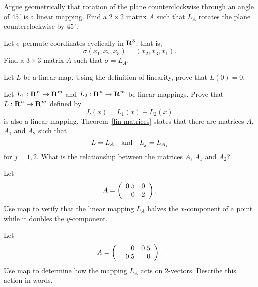 \begin{exercise} \label{c4.3.9}
Argue geometrically that rotation of the plane counterclockwise
through an angle of $45^\circ$ is a linear mapping.  Find a
$2\times 2$ matrix $A$ such that $L_A$ rotates the plane
counterclockwise by $45^\circ$.
\end{exercise}

\begin{exercise} \label{c4.3.10}
Let $\sigma$ permute coordinates cyclically in $\mbox{$\bf{R}$}^3$; that is,
\[
\sigma(x_1,x_2,x_3) = (x_2,x_3,x_1).
\]
Find a $3\times 3$ matrix $A$ such that $\sigma = L_A$.
\end{exercise}

\begin{exercise} \label{c4.3.11}
Let $L$ be a linear map.  Using the definition of linearity,
prove that $L(0)=0$.
\end{exercise}

\begin{exercise}  \label{c4.3.12}
Let $L_1:\mbox{$\bf{R}$}^n\to\mbox{$\bf{R}$}^m$ and $L_2:\mbox{$\bf{R}$}^n\to\mbox{$\bf{R}$}^m$ be linear mappings. Prove
that $L:\mbox{$\bf{R}$}^n\to\mbox{$\bf{R}$}^m$ defined by
\[
L(x) = L_1(x) + L_2(x)
\]
is also a linear mapping.  Theorem~\ref{lin-matrices} states that there
are matrices $A$, $A_1$ and $A_2$ such that
\[
L = L_A \quad\mbox{and}\quad L_j = L_{A_j}
\]
for $j=1,2$.  What is the relationship between the matrices $A$, $A_1$
and $A_2$?
\end{exercise}

\CEXER

\begin{exercise} \label{c4.3.13}
Let
\[
A = \left(\begin{array}{rr} 0.5 & 0\\ 0 &2\end{array}\right).
\]
Use {\sf map} to verify that the linear mapping $L_A$ halves
the $x$-component of a point while it doubles the $y$-component.
\end{exercise}

\begin{exercise} \label{c4.3.14}
Let
\[
A = \left(\begin{array}{rr} 0 & 0.5\\ -0.5 &0\end{array}\right).
\]
Use {\sf map} to determine how the mapping $L_A$ acts on $2$-vectors.
Describe this action in words.
\end{exercise}

